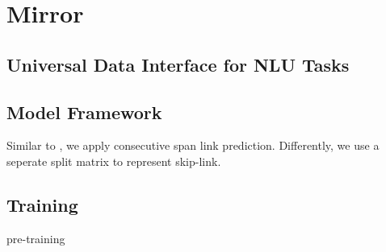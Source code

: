 \section{Mirror}

\subsection{Universal Data Interface for NLU Tasks}

\subsection{Model Framework}

Similar to \citet{li-et-al-w2ner}, we apply consecutive span link prediction.
Differently, we use a seperate split matrix to represent skip-link.

\subsection{Training}

pre-training


